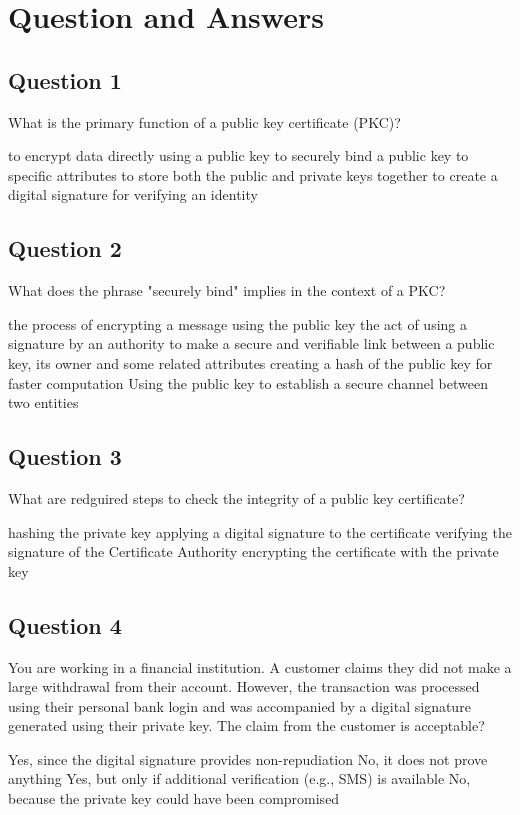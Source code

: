 \section{Question and Answers}
\subsection*{Question 1}
What is the primary function of a public key certificate (PKC)?
\begin{itemize}
  \incorrect to encrypt data directly using a public key
  \correct to securely bind a public key to specific attributes
  \incorrect to store both the public and private keys together
  \incorrect to create a digital signature for verifying an identity
\end{itemize}
\subsection*{Question 2}
What does the phrase "securely bind" implies in the context of a PKC?
\begin{itemize}
  \incorrect the process of encrypting a message using the public key
  \correct the act of using a signature by an authority to make a secure and verifiable link between a public key, its owner and some related attributes
  \incorrect creating a hash of the public key for faster computation
  \incorrect Using the public key to establish a secure channel between two
  entities
\end{itemize}
\subsection*{Question 3}
What are redguired steps to check the integrity of a public key certificate?
\begin{itemize}
  \incorrect hashing the private key
  \correct  applying a digital signature to the certificate
  \correct  verifying the signature of the Certificate Authority 
  \incorrect  encrypting the certificate with the private key
\end{itemize}
\subsection*{Question 4}
You are working in a financial institution. A customer claims they did not make
a large withdrawal from their account. However, the transaction was processed
using their personal bank login and was accompanied by a digital signature
generated using their private key. The claim from the customer is acceptable?
\begin{itemize}
  \correct Yes, since the digital signature provides non-repudiation 
  \incorrect No, it does not prove anything
  \incorrect Yes, but only if additional verification (e.g., SMS) is available
  \incorrect No, because the private key could have been compromised
\end{itemize}
